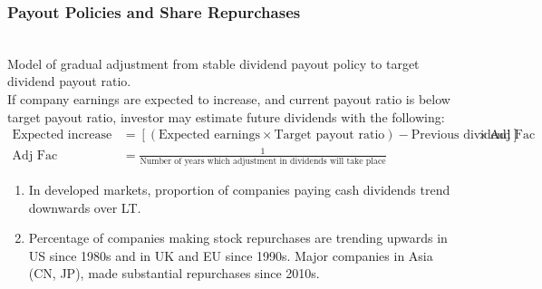 \subsubsection{Payout Policies and Share Repurchases}

\begin{method} \\
Model of gradual adjustment from stable dividend payout policy to target dividend payout ratio.\\
If company earnings are expected to increase, and current payout ratio is below target payout ratio, investor may estimate future dividends with the following:
\begin{align}
\text{Expected increase in dividends} &= [(\text{Expected earnings} \times \text{Target payout ratio}) - \text{Previous dividend}]\times \text{Adj Fac} \nonumber \\
\text{Adj Fac} &= \frac{1}{\text{Number of years which adjustment in dividends will take place}} \nonumber
\end{align}
\end{method}

\begin{remark} 
\begin{enumerate}[label=\roman*.]
\setlength{\itemsep}{0pt}
\item In developed markets, proportion of companies paying cash dividends trend downwards over LT.
\item Percentage of companies making stock repurchases are trending upwards in US since 1980s and in UK and EU since 1990s. Major companies in Asia (CN, JP), made substantial repurchases since 2010s.
\end{enumerate}
\end{remark}

